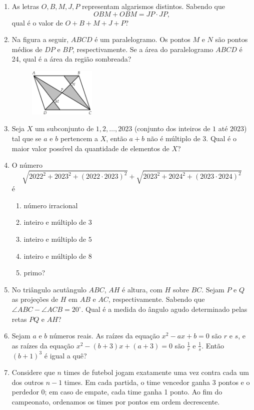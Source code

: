 \documentclass[12pt]{article}
\begin{document}
\begin{enumerate}[label=\textbf{\arabic*.}]
        \item As letras \(O, B, M, J, P\) representam algarismos distintos. Sabendo que
          \[
            OBM + OBM = JP \cdot JP,
          \]
          qual é o valor de \(O+B+M+J+P\)?
        \item Na figura a seguir, \(ABCD\) é um paralelogramo. Os pontos \(M\) e \(N\) são pontos médios de \(DP\) e \(BP\), respectivamente.
          Se a área do paralelogramo \(ABCD\) é 24, qual é a área da região sombreada?
          \begin{figure}[h]
            \centering
            \includegraphics[width=0.3\textwidth]{second.png}
          \end{figure}
        \item Seja $X$ um subconjunto de ${1, 2, \dots,2023}$ (conjunto dos inteiros de $1$ até $2023$) tal que se $a$ e $b$ pertencem a $X$, então $a + b$
          não é múltiplo de $3$. Qual é o maior valor possível da quantidade de elementos de \(X\)?
        \item O número
          \[
            \sqrt{2022^2 + 2023^2 + (2022\cdot2023)^2} + \sqrt{2023^2 + 2024^2 + (2023\cdot2024)^2}
          \]
          é
          \begin{enumerate}[label=({\Alph*})]
            \item número irracional 
            \item inteiro e múltiplo de $3$ 
            \item inteiro e múltiplo de $5$ 
            \item inteiro e múltiplo de $8$ 
            \item primo?
          \end{enumerate}
        \item No triângulo acutângulo \(ABC\), \(AH\) é altura, com \(H\) sobre \(BC\). Sejam \(P\) e \(Q\) as projeções de \(H\) em \(AB\)
          e \(AC\), respectivamente. Sabendo que \(\angle ABC - \angle ACB = 20^\circ\). Qual é a medida do ângulo agudo determinado pelas retas \(PQ\)
          e \(AH\)?
        \item Sejam \(a\) e \(b\) números reais. As raízes da equação \(x^2 - a x + b = 0\) são \(r\) e \(s\), e as raízes da equação
          \(x^2 - (b+3)x + (a+3) = 0\) são \(\frac{1}{r}\) e \(\frac{1}{s}\). Então \((b+1)^3\) é igual a quê?
        \item Considere que \(n\) times de futebol jogam exatamente uma vez contra cada um dos outros \(n-1\) times. Em cada partida, o time 
          vencedor ganha 3 pontos e o perdedor 0; em caso de empate, cada time ganha 1 ponto. Ao fim do campeonato, ordenamos os times por 
          pontos em ordem decrescente. 


\end{enumerate}
\end{document}
